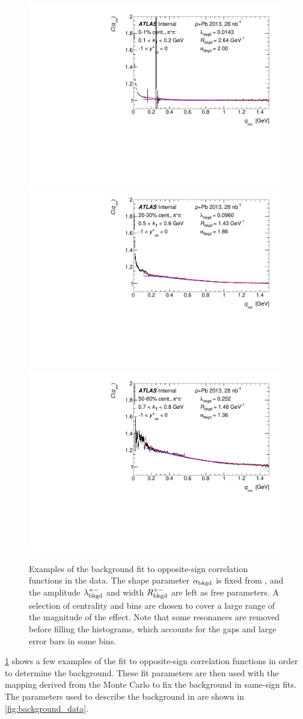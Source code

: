 \begin{figure}[t]
\centering
\includegraphics[width=.32\linewidth]{Cqinv_cent0_e0_kt0_ys1.pdf}
\includegraphics[width=.32\linewidth]{Cqinv_cent4_e0_kt4_ys1.pdf}
\includegraphics[width=.32\linewidth]{Cqinv_cent7_e0_kt6_ys1.pdf}
\caption{Examples of the background fit to opposite-sign correlation functions in the data. The shape parameter $\alpha_{\mathrm{bkgd}}$ is fixed from , and the amplitude $\lambda_{\mathrm{bkgd}}^{+-}$ and width $R_{\mathrm{bkgd}}^{+-}$ are left as free parameters. A selection of centrality and \kt bins are chosen to cover a large range of the magnitude of the effect. Note that some resonances are removed before filling the histograms, which accounts for the gaps and large error bars in some bins.}
\label{fig:background_qinv_opp_example}
\end{figure}

\cref{fig:background_qinv_opp_example} shows a few examples of the fit to opposite-sign correlation functions in order to determine the background.
These fit parameters are then used with the mapping derived from the Monte Carlo to fix the background in same-sign fits.
The parameters used to describe the background in \qinv are shown in \cref{fig:background_data}.

